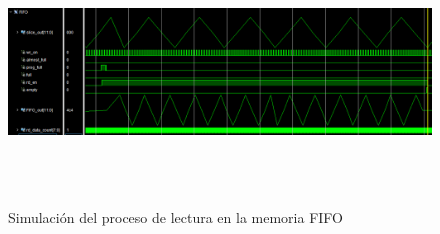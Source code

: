 \begin{figure}[h]
    \centering
    \includegraphics[width=1\textwidth,height=7cm]{img/simu/fifo_rd.PNG}
    \caption{Simulación del proceso de lectura en la memoria FIFO}
    \label{fig:fifo_rd}
\end{figure}
    
\vspace{3mm}

      
